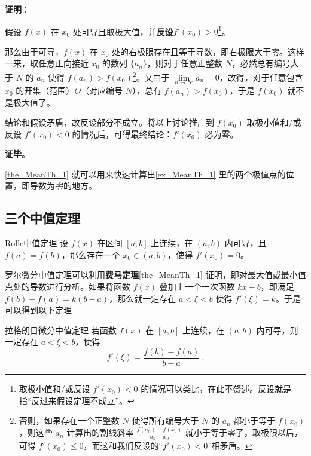 \textbf{证明}：

假设 $f(x)$ 在 $x_0$ 处可导且取极大值，并\textbf{反设}$f'(x_0)>0$\footnote{取极小值和/或反设 $f'(x_0)<0$ 的情况可以类比，在此不赘述。反设就是指“反过来假设定理不成立”。}。

那么由于可导，$f(x)$ 在 $x_0$ 处的右极限存在且等于导数，即右极限大于零。这样一来，取任意正向接近 $x_0$ 的数列 $\{a_n\}$，则对于任意正整数 $N$，必然总有编号大于 $N$ 的 $a_n$ 使得 $f(a_n)>f(x_0)$\footnote{否则，如果存在一个正整数 $N$ 使得所有编号大于 $N$ 的 $a_n$ 都小于等于 $f(x_0)$，则这些 $a_n$ 计算出的割线斜率 $\frac{f(a_n)-f(x_0)}{a_n-x_0}$ 就小于等于零了，取极限以后，可得 $f'(x_0)\leq 0$，而这和我们反设的“$f'(x_0)<0$”相矛盾。}。又由于 $\lim\limits_{n\to\infty}a_n=0$，故得，对于任意包含 $x_0$ 的开集（范围）$O$（对应编号 $N$），总有 $f(a_n)>f(x_0)$，于是 $f(x_0)$ 就不是极大值了。

结论和假设矛盾，故反设部分不成立。将以上讨论推广到 $f(x_0)$ 取极小值和/或反设 $f'(x_0)<0$ 的情况后，可得最终结论：$f'(x_0)$ 必为零。

\textbf{证毕}。

\autoref{the_MeanTh_1} 就可以用来快速计算出\autoref{ex_MeanTh_1} 里的两个极值点的位置，即导数为零的地方。


\subsection{三个中值定理}


\begin{definition}{Rolle中值定理}
设 $f(x)$ 在区间 $[a, b]$ 上连续，在 $(a, b)$ 内可导，且 $f(a)=f(b)$，那么存在一个 $x_0\in(a, b)$，使得 $f'(x_0)=0$。
\end{definition}

罗尔微分中值定理可以利用\textbf{费马定理}\autoref{the_MeanTh_1} 证明，即对最大值或最小值点处的导数进行分析。如果将函数 $f(x)$ 叠加上一个一次函数 $kx+b$，即满足 $f(b)-f(a)=k(b-a)$，那么就一定存在 $a< \xi <b$ 使得 $f'(\xi)=k$。于是可以得到以下定理

\begin{theorem}{拉格朗日微分中值定理}\label{the_MeanTh_2}
若函数 $f(x)$ 在 $[a,b]$ 上连续，在 $(a,b)$ 内可导，则一定存在 $a< \xi <b$，使得
\begin{equation}\label{eq_MeanTh_2}
f'(\xi)=\frac{f(b)-f(a)}{b-a}~.
\end{equation}
\end{theorem}

